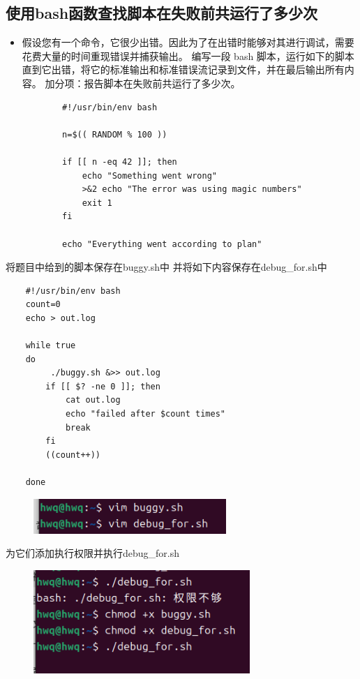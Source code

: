 \documentclass[a4paper, 12pt]{article}
\begin{document}
\subsection{使用bash函数查找脚本在失败前共运行了多少次}
\begin{itemize}
    \item 假设您有一个命令，它很少出错。因此为了在出错时能够对其进行调试，需要花费大量的时间重现错误并捕获输出。 编写一段 bash 脚本，运行如下的脚本直到它出错，将它的标准输出和标准错误流记录到文件，并在最后输出所有内容。 加分项：报告脚本在失败前共运行了多少次。
    \begin{verbatim}
        #!/usr/bin/env bash

        n=$(( RANDOM % 100 ))

        if [[ n -eq 42 ]]; then
            echo "Something went wrong"
            >&2 echo "The error was using magic numbers"
            exit 1
        fi

        echo "Everything went according to plan"
    \end{verbatim}
\end{itemize}
将题目中给到的脚本保存在buggy.sh中
并将如下内容保存在debug\_for.sh中
\begin{verbatim}
    #!/usr/bin/env bash
    count=0
    echo > out.log

    while true
    do
         ./buggy.sh &>> out.log
        if [[ $? -ne 0 ]]; then
            cat out.log
            echo "failed after $count times"
            break
        fi
        ((count++))

    done
\end{verbatim}
\begin{figure}[H]
    \centering
    \includegraphics[width=1\linewidth]{shell18.png}
\end{figure}
为它们添加执行权限并执行debug\_for.sh
\begin{figure}[H]
    \centering
    \includegraphics[width=1\linewidth]{shell19.png}
\end{figure}
\end{document}
